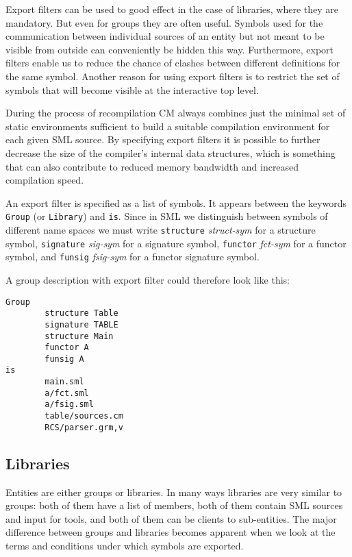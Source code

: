 \documentclass{article}
\begin{document}
Export filters can be used to good effect in the case of libraries,
where they are mandatory.  But even for groups they are often useful.
Symbols used for the communication between individual sources of an
entity but not meant to be visible from outside can conveniently be
hidden this way.  Furthermore, export filters enable us to reduce the
chance of clashes between different definitions for the same symbol.
Another reason for using export filters is to restrict the set of
symbols that will become visible at the interactive top level.

During the process of recompilation CM always combines just the
minimal set of static environments sufficient to build a suitable
compilation environment for each given SML source.  By specifying
export filters it is possible to further decrease the size of the
compiler's internal data structures, which is something that can also
contribute to reduced memory bandwidth and increased compilation
speed.

An export filter is specified as a list of symbols. It appears
between the keywords {\tt Group} (or {\tt Library}) and {\tt is}.
Since in SML we distinguish between symbols of different name spaces
we must write {\tt structure} {\em struct-sym} for a structure symbol,
{\tt signature} {\em sig-sym} for a signature symbol, {\tt functor}
{\em fct-sym} for a functor symbol, and {\tt funsig} {\em fsig-sym}
for a functor signature symbol.

A group description with export filter could therefore look like this:
{\samepage

\begin{verbatim}
Group
        structure Table
        signature TABLE
        structure Main
        functor A
        funsig A
is
        main.sml
        a/fct.sml
        a/fsig.sml
        table/sources.cm
        RCS/parser.grm,v
\end{verbatim}
}

\subsection{Libraries}

Entities are either groups or libraries.  In many ways libraries
are very similar to groups: both of them have a list of members, both
of them contain SML sources and input for tools, and both of them can
be clients to sub-entities.  The major difference between groups and
libraries becomes apparent when we look at the terms and conditions
under which symbols are exported.
\end{document}
